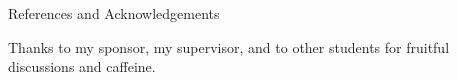 \documentclass[final]{beamer}
\begin{document}
\begin{frame}{}
\begin{textblock}{19.0}
\begin{block}{References and Acknowledgements}
\begin{minipage}{0.9\linewidth}
     {     \printbibliography   %
     } 
\end{minipage}
\vspace{2ex}
{
\tiny Thanks to my sponsor, my supervisor, and to other students for
  fruitful discussions and caffeine.
\par
}
\end{block}

\end{textblock}

\end{frame}
\end{document}
